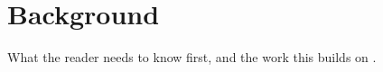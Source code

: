 \chapter{Background}
\label{chap:background}

What the reader needs to know first, and the work this builds on \citep{knuth1984}.
